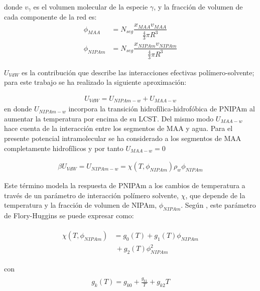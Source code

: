	
	\noindent donde $v_\gamma$  es el volumen molecular de la especie $\gamma$, y la fracci\'on de volumen de cada componente de la red es: 
	\begin{align}
		\phi_{MAA}&=N_{seg}\dfrac{x_{MAA}v_{MAA}}{\frac{4}{3}\pi R^3}\\
		\phi_{NIPAm}&=N_{seg}\dfrac{x_{NIPAm}v_{NIPAm}}{\frac{4}{3}\pi R^3}
		\label{eq:mc:vol_fraccs}
	\end{align}
	
	
	
	$U_{VdW}$ es la contribuci\'on que describe las interacciones efectivas pol\'imero-solvente; para este trabajo  se ha realizado la siguiente aproximaci\'on: 
	
	\begin{align}
		U_{VdW} = U_{NIPAm-w} + U_{MAA-w}
	\end{align}
	\noindent en donde $U_{NIPAm-w}$ incorpora la transici\'on hidrof\'ilica-hidrof\'obica de PNIPAm al aumentar la temperatura por encima de su LCST. 
	Del mismo modo $U_{MAA-w}$ hace cuenta de la interacci\'on entre los segmentos de MAA y agua.
	Para el presente potencial intramolecular se ha considerado a los segmentos de MAA completamente hidrof\'ilicos y por tanto $U_{MAA-w} = 0$
	
	\begin{align}
		\beta U_{VdW} = U_{NIPAm-w} = \chi (T, \phi_{NIPAm})\rho_w \phi_{NIPAm}
	\end{align}
	
	
	Este  t\'ermino modela la respuesta de PNIPAm a los cambios de temperatura a trav\'es de un par\'ametro de interacci\'on pol\'imero solvente, $\chi$, que depende de la temperatura y la fracci\'on de volumen de NIPAm, $\phi_{NIPAm}$.
	Seg\'un  \citet{afroze2000}, este par\'ametro de Flory-Huggins se puede expresar como:
	
	
	\begin{align}
		\begin{aligned}
			\chi (T, \phi_{NIPAm}) &=g_0(T) +g_1(T)\phi_{NIPAm} \\
			&~+ g_2(T)\phi_{NIPAm}^2
		\end{aligned}
	\end{align}
	
	\noindent con
	\begin{align}
		\begin{aligned} 
			g_k(T)=g_{k0} + \frac{g_{k1}}{T} + g_{k2}T
		\end{aligned}
	\end{align}
	
